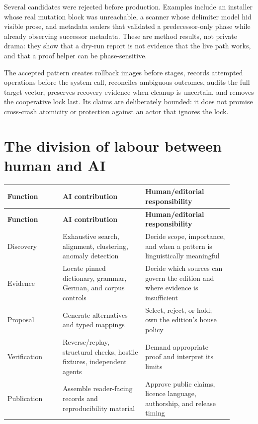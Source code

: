 \documentclass[11pt,a4paper]{article}
\begin{document}
Several candidates were rejected before production. Examples include an installer whose real mutation block was unreachable, a scanner whose delimiter model hid visible prose, and metadata sealers that validated a predecessor-only phase while already observing successor metadata. These are method results, not private drama: they show that a dry-run report is not evidence that the live path works, and that a proof helper can be phase-sensitive.

The accepted pattern creates rollback images before stages, records attempted operations before the system call, reconciles ambiguous outcomes, audits the full target vector, preserves recovery evidence when cleanup is uncertain, and removes the cooperative lock last. Its claims are deliberately bounded: it does not promise cross-crash atomicity or protection against an actor that ignores the lock.

\section{The division of labour between human and AI}

\begin{longtable}{>{\raggedright\arraybackslash}p{0.22\linewidth} >{\raggedright\arraybackslash}p{0.33\linewidth} >{\raggedright\arraybackslash}p{0.35\linewidth}}
\toprule
\textbf{Function} & \textbf{AI contribution} & \textbf{Human/editorial responsibility} \\
\midrule
\endfirsthead
\toprule
\textbf{Function} & \textbf{AI contribution} & \textbf{Human/editorial responsibility} \\
\midrule
\endhead
Discovery & Exhaustive search, alignment, clustering, anomaly detection & Decide scope, importance, and when a pattern is linguistically meaningful \\
Evidence & Locate pinned dictionary, grammar, German, and corpus controls & Decide which sources can govern the edition and where evidence is insufficient \\
Proposal & Generate alternatives and typed mappings & Select, reject, or hold; own the edition's house policy \\
Verification & Reverse/replay, structural checks, hostile fixtures, independent agents & Demand appropriate proof and interpret its limits \\
Publication & Assemble reader-facing records and reproducibility material & Approve public claims, licence language, authorship, and release timing \\
\bottomrule
\end{longtable}
\end{document}
